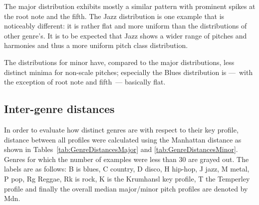 \documentclass{article}
\begin{document}
The major distribution exhibits mostly a similar pattern with prominent spikes at the root note and the fifth. The Jazz distribution is one example that is noticeably different: it is rather flat and more uniform than the distributions of other genre's. It is to be expected that Jazz shows a wider range of pitches and harmonies and thus a more uniform pitch class distribution.

The distributions for minor have, compared to the major distributions, less distinct minima for non-scale pitches; especially the Blues distribution is ---~with the exception of root note and fifth~--- basically flat.

\subsection{Inter-genre distances}
In order to evaluate how distinct genres are with respect to their key profile, distance between all profiles were calculated using the Manhattan distance as shown in Tables~\ref{tab:GenreDistancesMajor} and \ref{tab:GenreDistancesMinor}. Genres for which the number of examples were less than 30 are grayed out. The labels are as follows: B is blues, C country, D disco, H hip-hop, J jazz, M metal, P pop, Rg Reggae, Rk is rock, K is the Krumhansl key profile, T the Temperley profile \cite{temperley_tonal_2007} and finally the overall median major/minor pitch profiles are denoted by Mdn.
\end{document}
